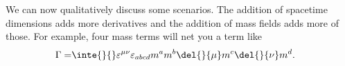We can now qualitatively discuss some scenarios. The addition of spacetime dimensions adds more derivatives and the addition of mass fields adds more of those. For example, four mass terms will net you a term like
\begin{align*}
	\Gamma =& \inte{}{}\varepsilon^{\mu\nu}\varepsilon_{abcd}m^{a}m^{b}\del{}{\mu}m^{c}\del{}{\nu}m^{d}.
\end{align*}